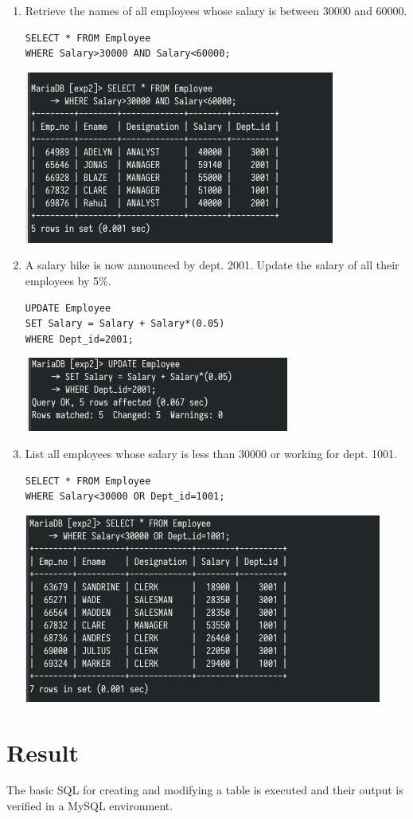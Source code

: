 \documentclass[13pt,oneside]{book}
\begin{document}
\begin{enumerate}
		\item
Retrieve the names of all employees whose salary is between 30000
and 60000.
    \begin{verbatim}
SELECT * FROM Employee
WHERE Salary>30000 AND Salary<60000;
    \end{verbatim}
	\includegraphics[]{img/p2/ss10.png}
	
		\item
A salary hike is now announced by dept. 2001. Update the salary of all
their employees by 5\%.

    \begin{verbatim}
UPDATE Employee
SET Salary = Salary + Salary*(0.05)
WHERE Dept_id=2001;
    \end{verbatim}
	\includegraphics[]{img/p2/ss11.png}
	
			\item
List all employees whose salary is less than 30000 or working for dept.
1001.

    \begin{verbatim}
SELECT * FROM Employee
WHERE Salary<30000 OR Dept_id=1001;

    \end{verbatim}
	\includegraphics[]{img/p2/ss12.png}
	
	\end{enumerate}
	\section*{Result}
	The basic SQL for creating and modifying a table is executed and their output
	is verified in a MySQL environment.
\end{document}
